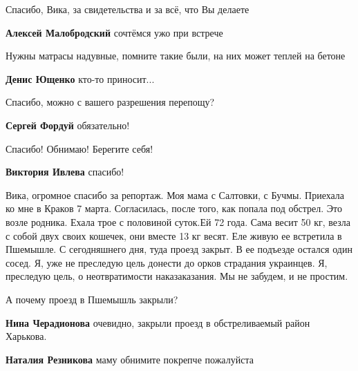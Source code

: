  
 
 
 
 
\zzSecCmt

\begin{itemize} %

Спасибо, Вика, за свидетельства и за всё, что Вы делаете

\textbf{Алексей Малобродский} сочтёмся ужо при встрече

Нужны матрасы надувные, помните такие были, на них может теплей на бетоне

\textbf{Денис Ющенко} кто-то приносит...

Спасибо, можно с вашего разрешения перепощу?

\begin{itemize} %
\textbf{Сергей Фордуй} обязательно!

Спасибо! Обнимаю! Берегите себя!

\textbf{Виктория Ивлева} спасибо!
\end{itemize} %


Вика, огромное спасибо за репортаж. Моя мама с Салтовки, с Бучмы. Приехала ко
мне в Краков 7 марта. Согласилась, после того, как попала под обстрел. Это
возле родника. Ехала трое с половиной суток.Ей 72 года. Сама весит 50 кг, везла
с собой двух своих кошечек, они вместе 13 кг весят. Еле живую ее встретила в
Пшемышле. С сегодняшнего дня, туда проезд закрыт. В ее подъезде остался один
сосед. Я, уже не преследую цель донести до орков страдания украинцев. Я,
преследую цель, о неотвратимости наказаказания. Мы не забудем, и не простим.

\begin{itemize} %
А почему проезд в Пшемышль закрыли?

\textbf{Нина Черадионова} очевидно, закрыли проезд в обстреливаемый район Харькова.

\textbf{Наталия Резникова} маму обнимите покрепче пожалуйста


\end{itemize}
\end{itemize}
